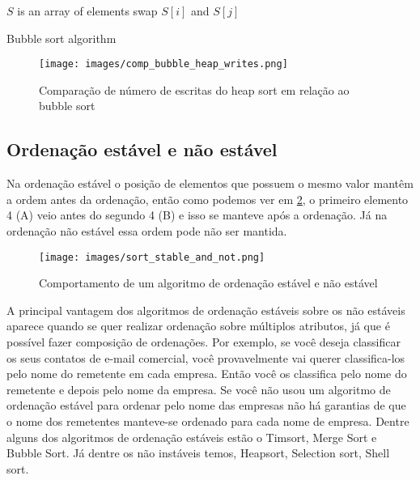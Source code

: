 \documentclass[12pt]{article}
\begin{document}
\begin{algorithm}
\begin{algorithmic}

\STATE $S$ is an array of elements
            \STATE swap $S[i]$ and $S[j]$
        \ENDIF
    \ENDFOR
\ENDFOR

\end{algorithmic}
\caption{Bubble sort algorithm}
\label{algo:bubble_sort}
\end{algorithm}

\begin{figure}[ht]
\centering
\texttt{[image: images/comp\_bubble\_heap\_writes.png]}
\caption{Comparação de número de escritas do heap sort em relação ao bubble sort}
\label{fig:comparacao_heap_bubble}
\end{figure}



\subsection{Ordenação estável e não estável}
Na ordenação estável o posição de elementos que possuem o mesmo valor mantêm a ordem antes da ordenação, então como podemos ver em \ref{fig:stable_sort}, o primeiro elemento 4 (A) veio antes do segundo 4 (B) e isso se manteve após a ordenação. Já na ordenação não estável essa ordem pode não ser mantida.

\begin{figure}[ht]
\centering
\texttt{[image: images/sort\_stable\_and\_not.png]}
\caption{Comportamento de um algoritmo de ordenação estável e não estável}
\label{fig:stable_sort}
\end{figure}

A principal vantagem dos algoritmos de ordenação estáveis sobre os não estáveis aparece quando se quer realizar ordenação sobre múltiplos atributos, já que é possível fazer composição de ordenações. Por exemplo, se você deseja classificar os seus contatos de e-mail comercial, você provavelmente vai querer classifica-los pelo nome do remetente em cada empresa. Então você os classifica pelo nome do remetente e depois pelo nome da empresa. Se você não usou um algoritmo de ordenação estável para ordenar pelo nome das empresas não há garantias de que o nome dos remetentes manteve-se ordenado para cada nome de empresa. Dentre alguns dos algoritmos de ordenação estáveis estão o Timsort, Merge Sort \cite{auger2015merge} e Bubble Sort. Já dentre os não instáveis temos, Heapsort, Selection sort, Shell sort.  
\end{document}
